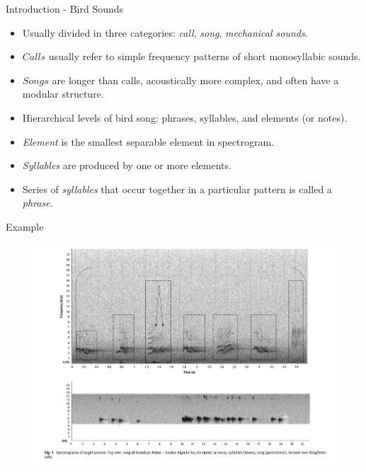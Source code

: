 \documentclass[10pt]{beamer}
\begin{document}
\begin{frame}[fragile]{Introduction - Bird Sounds}
\begin{itemize}
\item Usually divided in three categories: \textit{call}, \textit{song}, \textit{mechanical sounds}.
\item $Calls$ usually refer to simple frequency 
patterns of short  monosyllabic sounds. 
\item  $Songs$ are longer than calls,  acoustically more complex, and often have a modular  structure.
\item  Hierarchical levels of bird  song: phrases,
syllables,  and elements (or notes).
\item  \textit{Element}  is the smallest  separable  element
in  spectrogram.
\item  \textit{Syllables} are produced  by one or more elements.
\item Series of \textit{syllables} that occur  together in a particular pattern is called a \textit{phrase}.

\end{itemize}
\end{frame}

\begin{frame}{Example}
\begin{figure}[h]
\includegraphics[width=1\textwidth]{song_call}
\end{figure}
\end{frame}
\end{document}
